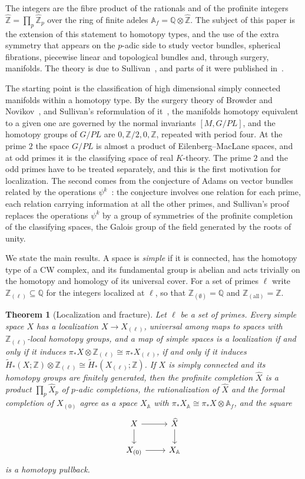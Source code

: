 \documentclass[11pt]{amsart}
\theoremstyle{plain}
\newtheorem{theoremA}{Theorem}
\theoremstyle{definition}
\numberwithin{equation}{section}
\newcommand{\Z}{\mathbb{Z}}
\newcommand{\Q}{\mathbb{Q}}
\newcommand{\Zhat}{\widehat{\mathbb{Z}}}
\newcommand{\Af}{\mathbb{A}_f}
\newcommand{\Zl}{\mathbb{Z}_{(\ell)}}
\newcommand{\hX}{\widehat{X}}
\begin{document}
The integers are the fibre product of the rationals and of the profinite integers $\Zhat=\prod_p\Zhat_p$ over the ring of finite adeles $\Af=\Q\otimes\Zhat$.
The subject of this paper is the extension of this statement to homotopy types, and the use of the extra symmetry that appears on the $p$-adic side to study vector bundles, spherical fibrations, piecewise linear and topological bundles and, through surgery, manifolds.
The theory is due to Sullivan~\cite{SulMIT}, and parts of it were published in~\cite{SulICM,SulGenetics,SulPeriodicity,MS74}.

The starting point is the classification of high dimensional simply connected manifolds within a homotopy type.
By the surgery theory of Browder and Novikov~\cite{Browder,Novikov}, and Sullivan's reformulation of it~\cite{SulHaupt}, the manifolds homotopy equivalent to a given one are governed by the normal invariants $[M,G/PL]$, and the homotopy groups of $G/PL$ are $0,\Z/2,0,\Z$, repeated with period four.
At the prime $2$ the space $G/PL$ is almost a product of Eilenberg--MacLane spaces, and at odd primes it is the classifying space of real $K$-theory.
The prime $2$ and the odd primes have to be treated separately, and this is the first motivation for localization.
The second comes from the conjecture of Adams on vector bundles related by the operations $\psi^k$~\cite{AdamsJ1}: the conjecture involves one relation for each prime, each relation carrying information at all the other primes, and Sullivan's proof replaces the operations $\psi^k$ by a group of symmetries of the profinite completion of the classifying spaces, the Galois group of the field generated by the roots of unity.

We state the main results.
A space is \emph{simple} if it is connected, has the homotopy type of a CW complex, and its fundamental group is abelian and acts trivially on the homotopy and homology of its universal cover.
For a set of primes $\ell$ write $\Zl\subseteq\Q$ for the integers localized at $\ell$, so that $\Z_{(\emptyset)}=\Q$ and $\Z_{(\text{all})}=\Z$.

\begin{theoremA}[Localization and fracture]\label{thm:A}
Let $\ell$ be a set of primes.
Every simple space $X$ has a localization $X\to X_{(\ell)}$, universal among maps to spaces with $\Zl$-local homotopy groups, and a map of simple spaces is a localization if and only if it induces $\pi_*X\otimes\Zl\cong\pi_*X_{(\ell)}$, if and only if it induces $\widetilde H_*(X;\Z)\otimes\Zl\cong\widetilde H_*(X_{(\ell)};\Z)$.
If $X$ is simply connected and its homotopy groups are finitely generated, then the profinite completion $\hX$ is a product $\prod_p\hX_p$ of $p$-adic completions, the rationalization of $\hX$ and the formal completion of $X_{(0)}$ agree as a space $X_{\mathbb A}$ with $\pi_*X_{\mathbb A}\cong\pi_*X\otimes\Af$, and the square
\[
\begin{tikzcd}
X\arrow[r]\arrow[d] & \hX\arrow[d]\\
X_{(0)}\arrow[r] & X_{\mathbb A}
\end{tikzcd}
\]
is a homotopy pullback.
\end{theoremA}
\end{document}

